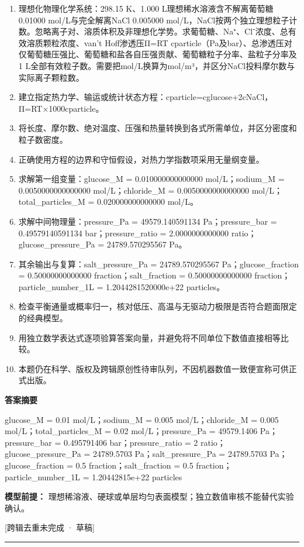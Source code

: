 \documentclass[UTF8,11pt,a4paper]{ctexart}
\begin{document}
\begin{enumerate}
\item 理想化物理化学系统：298.15 K、1.000 L理想稀水溶液含不解离葡萄糖0.01000 mol/L与完全解离NaCl 0.005000 mol/L，NaCl按两个独立理想粒子计数。忽略离子对、溶质体积及非理想化学势。求葡萄糖、Na⁺、Cl⁻浓度、总有效溶质颗粒浓度、van't Hoff渗透压Π=RT cparticle（Pa及bar）、总渗透压对仅葡萄糖压强比、葡萄糖和盐各自压强贡献、葡萄糖粒子分率、盐粒子分率及1 L全部有效粒子数。需要把mol/L换算为mol/m³，并区分NaCl投料摩尔数与实际离子颗粒数。
\item 建立指定热力学、输运或统计状态方程：cparticle=cglucose+2cNaCl，Π=RT×1000cparticle。
\item 将长度、摩尔数、绝对温度、压强和热量转换到各式所需单位，并区分密度和粒子数密度。
\item 正确使用方程的边界和守恒假设，对热力学指数项采用无量纲变量。
\item 求解第一组变量：glucose\_M = 0.010000000000000 mol/L；sodium\_M = 0.0050000000000000 mol/L；chloride\_M = 0.0050000000000000 mol/L；total\_particles\_M = 0.020000000000000 mol/L。
\item 求解中间物理量：pressure\_Pa = 49579.140591134 Pa；pressure\_bar = 0.49579140591134 bar；pressure\_ratio = 2.0000000000000 ratio；glucose\_pressure\_Pa = 24789.570295567 Pa。
\item 其余输出与复算：salt\_pressure\_Pa = 24789.570295567 Pa；glucose\_fraction = 0.50000000000000 fraction；salt\_fraction = 0.50000000000000 fraction；particle\_number\_1L = 1.2044281520000e+22 particles。
\item 检查平衡通量或概率归一，核对低压、高温与无驱动力极限是否符合题面限定的经典模型。
\item 用独立数学表达式逐项验算答案向量，并避免将不同单位下数值直接相等比较。
\item 本题仍在科学、版权及跨辑原创性待审队列，不因机器数值一致便宣称可供正式出版。
\end{enumerate}
\noindent\textbf{答案摘要}\par
glucose\_M = 0.01 mol/L；sodium\_M = 0.005 mol/L；chloride\_M = 0.005 mol/L；total\_particles\_M = 0.02 mol/L；pressure\_Pa = 49579.1406 Pa；pressure\_bar = 0.495791406 bar；pressure\_ratio = 2 ratio；glucose\_pressure\_Pa = 24789.5703 Pa；salt\_pressure\_Pa = 24789.5703 Pa；glucose\_fraction = 0.5 fraction；salt\_fraction = 0.5 fraction；particle\_number\_1L = 1.20442815e+22 particles\par
\noindent\textbf{模型前提：}
理想稀溶液、硬球或单层均匀表面模型；独立数值审核不能替代实验确认。\par
\noindent\textcolor{red!65!black}{[跨辑去重未完成 · 草稿]} \par
\medskip\hrule\medskip
{}
\end{document}
